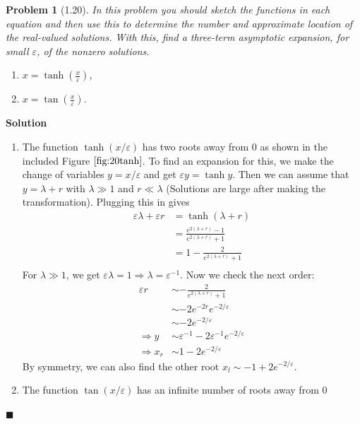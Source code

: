 \documentclass[11pt]{article}
\newcommand{\vep}{\varepsilon}
\theoremstyle{problemstyle}
\newtheorem{problem}{Problem}
\newenvironment{solution}
  {\noindent\textbf{Solution}\quad}
  {\hfill$\blacksquare$\par\vspace{1em}}
\begin{document}
\newpage
\begin{problem}[1.20]
  In this problem you should sketch the functions in each equation and then use this to determine
  the number and approximate location of the real-valued solutions. With this, find a three-term
  asymptotic expansion, for small $\vep$, of the nonzero solutions.
  \begin{enumerate}
    \item $x = \tanh \left(\frac{x}{\vep}\right)$,
    \item $x = \tan\left(\frac{x}{\vep}\right)$.
  \end{enumerate}
\end{problem}

\begin{solution}
  \begin{enumerate}
    \item 
      The function $\tanh(x/\vep)$ has two roots away from 0 as shown in the
      included Figure $\ref{fig:20tanh}$. To find an expansion for this, we make
      the change of variables $y = x/\vep$ and get $\vep y = \tanh y$. Then we
      can assume that $y = \lambda + r$ with $\lambda \gg 1$ and $r \ll
      \lambda$ (Solutions are large after making the transformation). Plugging
      this in gives
      \begin{align*}
        \vep\lambda + \vep r & = \tanh(\lambda + r) \\
                             & = \frac{e^{2(\lambda + r)} - 1}{e^{2(\lambda +
        r)} + 1} \\
                             & = 1 - \frac{2}{e^{2(\lambda + r)} + 1} \\
      \end{align*}
      For $\lambda \gg 1$, we get $\vep\lambda = 1 \Rightarrow \lambda =
      \vep^{-1}$. Now we check the next order:
      \begin{align*}
        \vep r & \sim -\frac{2}{e^{2(\lambda + r)} + 1} \\
               & \sim -2e^{-2r}e^{-2/\vep} \\
               & \sim -2e^{-2/\vep} \\
        \Rightarrow y & \sim \vep^{-1} -2\vep^{-1}e^{-2/\vep} \\
        \Rightarrow x_r & \sim 1 -2e^{-2/\vep}
      \end{align*}
      By symmetry, we can also find the other root $x_l \sim -1 + 2e^{-2/\vep}$.
    \item 
      The function $\tan(x/\vep)$ has an infinite number of  roots away from 0

\end{enumerate}
\end{solution}
\end{document}
